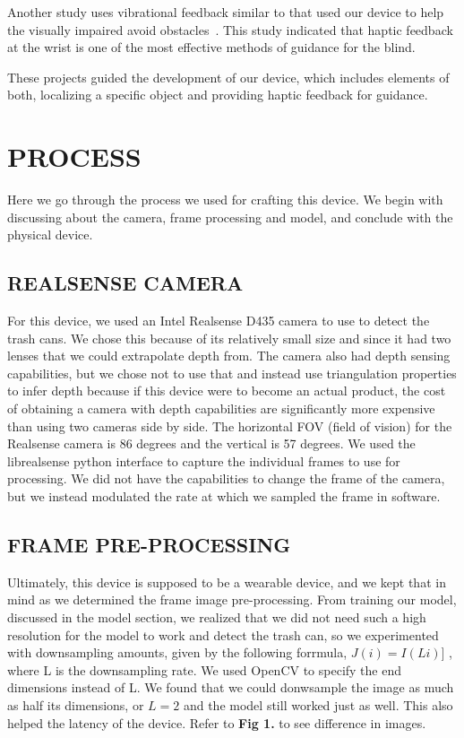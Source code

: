 \documentclass{article}
\begin{document}
Another study uses vibrational feedback similar to that used our device to help the visually impaired avoid obstacles~\cite{Kinect}. This study indicated that haptic feedback at the wrist is one of the most effective methods of guidance for the blind.

These projects guided the development of our device, which includes elements of both, localizing a specific object and providing haptic feedback for guidance.

\section{PROCESS}
\label{sec:theprocess}

Here we go through the process we used for crafting this device. We begin with discussing about the camera, frame processing and model, and conclude with the physical device.

\subsection{REALSENSE CAMERA}
\label{ssec:realsense}

For this device, we used an Intel Realsense D435 camera to use to detect the trash cans. We chose this because of its relatively small size and since it had two lenses that we could extrapolate depth from. The camera also had depth sensing capabilities, but we chose not to use that and instead use triangulation properties to infer depth because if this device were to become an actual product, the cost of obtaining a camera with depth capabilities are significantly more expensive than using two cameras side by side. The horizontal FOV (field of vision) for the Realsense camera is 86 degrees and the vertical is 57 degrees. We used the librealsense python interface \cite{realsense} to capture the individual frames to use for processing. We did not have the capabilities to change the frame of the camera, but we instead modulated the rate at which we sampled the frame in software. 

\subsection{FRAME PRE-PROCESSING}
\label{ssec:frprep}

Ultimately, this device is supposed to be a wearable device, and we kept that in mind as we determined the frame image pre-processing. From training our model, discussed in the model section, we realized that we did not need such a high resolution for the model to work and detect the trash can, so we experimented with downsampling amounts, given by the following forrmula, $J(i) = I(Li)]$ \cite{Bovik19}, where L is the downsampling rate. We used OpenCV \cite{opencv_library} to specify the end dimensions instead of L. We found that we could donwsample the image as much as half its dimensions, or $L = 2$ and the model still worked just as well. This also helped the latency of the device. Refer to \textbf{Fig 1.} to see difference in images. 
\end{document}

